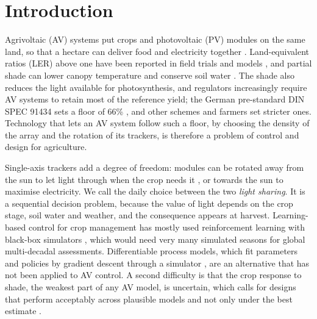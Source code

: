\section{Introduction}\label{sec:intro}

Agrivoltaic (AV) systems put crops and photovoltaic (PV) modules on the same land, so that a hectare can deliver food and electricity together \citep{dupraz2011,dinesh2016}. Land-equivalent ratios (LER) above one have been reported in field trials and models \citep{amaducci2018,valle2017,trommsdorff2021}, and partial shade can lower canopy temperature and conserve soil water \citep{marrou2013,adeh2018,weselek2021}. The shade also reduces the light available for photosynthesis, and regulators increasingly require AV systems to retain most of the reference yield; the German pre-standard DIN SPEC 91434 sets a floor of 66\% \citep{din2021}, and other schemes and farmers set stricter ones. Technology that lets an AV system follow such a floor, by choosing the density of the array and the rotation of its trackers, is therefore a problem of control and design for agriculture.

Single-axis trackers add a degree of freedom: modules can be rotated away from the sun to let light through when the crop needs it \citep{valle2017}, or towards the sun to maximise electricity. We call the daily choice between the two \emph{light sharing}. It is a sequential decision problem, because the value of light depends on the crop stage, soil water and weather, and the consequence appears at harvest. Learning-based control for crop management has mostly used reinforcement learning with black-box simulators \citep{gautron2022}, which would need very many simulated seasons for global multi-decadal assessments. Differentiable process models, which fit parameters and policies by gradient descent through a simulator \citep{reichstein2019,shen2023}, are an alternative that has not been applied to AV control. A second difficulty is that the crop response to shade, the weakest part of any AV model, is uncertain, which calls for designs that perform acceptably across plausible models and not only under the best estimate \citep{marchau2019}.

